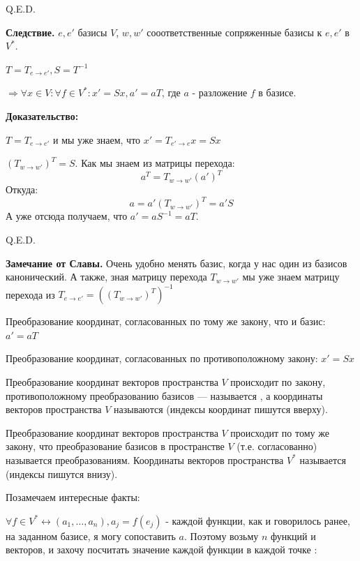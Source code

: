 \hfill Q.E.D.

\textbf{Следствие.} $e,e'$ базисы $V$, $w,w'$ сооответственные сопряженные базисы к $e,e'$ в $V^*$.

$T = T_{e\rightarrow e'}, S = T^{-1}$

$ \Rightarrow \forall x \in V: \forall f \in V^*:x' = Sx, a' = aT$, где $a$ - разложение $f$ в базисе.

\textbf{Доказательство:}    

$T=T_{e\rightarrow e'}$ и мы уже знаем, что $x' = T_{e'\rightarrow e}x = Sx$ 

$(T_{w\rightarrow w'})^T = S$. Как мы знаем из матрицы перехода:
$$a^T = T_{w\rightarrow w'}(a')^T$$ 
Откуда:
$$a = a'(T_{w\rightarrow w'})^T = a'S$$
А уже отсюда получаем, что $a' = aS^{-1} = aT$.

\hfill Q.E.D.

\textbf{Замечание от Славы.} Очень удобно менять базис, когда у нас один из базисов канонический. А также, зная матрицу перехода $T_{w\rightarrow w'}$ мы уже знаем матрицу перехода из $T_{e\rightarrow e'} =((T_{w\rightarrow w'})^T)^{-1} $


Преобразование координат, согласованных по тому же закону, что и базис:
$a' =a T$

Преобразование координат, согласованных по противоположному закону:
$x' = Sx$

 Преобразование координат векторов пространства $V$ происходит по закону, противоположному преобразованию базисов --- называется , а координаты векторов пространства $V$ называются  (индексы координат пишутся вверху).

 Преобразование координат векторов пространства $V$ происходит по тому же закону, что преобразование базисов в пространстве $V$ (т.е. согласованно) называется  преобразованиям.
Координаты векторов пространства $V^* $ называется  (индексы пишутся внизу).

Позамечаем интересные факты:

$\forall f \in V^* \leftrightarrow (a_1,\ldots, a_n), a_j = f(e_j)$ - каждой функции, как и говорилось ранее, на заданном базисе, я могу сопоставить $a$. Поэтому возьму $n$ функций и векторов, и захочу посчитать значение каждой функции в каждой точке : 

